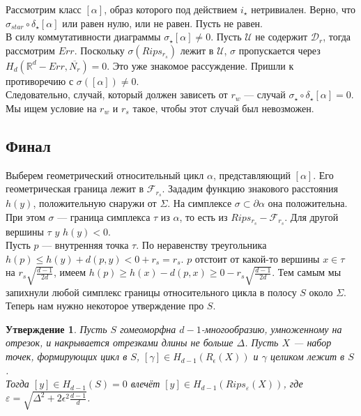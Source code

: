 \documentclass[english,12pt]{article}
\newcounter{stmcounter}[section]
\numberwithin{equation}{section}
\newtheorem{proposition}[stmcounter]{Утверждение}
\theoremstyle{definition}
\theoremstyle{remark}
\renewcommand{\leq}{\leqslant}
\renewcommand{\geq}{\geqslant}
\begin{document}
Рассмотрим класс $[\alpha]$, образ которого под действием $i_{\star}$ нетривиален. Верно, что $\sigma_{star} \circ \delta_{\star}[\alpha]$ или равен нулю, или не равен. Пусть не равен.\\

В силу коммутативности диаграммы $\sigma_{\star}[\alpha] \neq 0$. Пусть $\mathcal{U}$ не содержит $\mathcal{D}_r$, тогда рассмотрим $Err$. Поскольку $\sigma(Rips_{r_s})$ лежит в $\mathcal{U}$, $\sigma$ пропускается через $H_d(\mathbb{R}^d - Err, \overline{N_r}) = 0$. Это уже знакомое рассуждение. Пришли к противоречию с $\sigma([\alpha]) \neq 0$.\\

Следовательно, случай, который должен зависеть от $r_w$ --- случай $\sigma_{\star} \circ \delta_{\star}[\alpha] = 0$. Мы ищем условие на $r_w$ и $r_s$ такое, чтобы этот случай был невозможен.

\subsection{Финал}

Выберем геометрический относительный цикл $\alpha$, представляющий $[\alpha]$. Его геометрическая граница лежит в $\mathcal{F}_{r_s}$. Зададим функцию знакового расстояния $h(y)$, положительную снаружи от $\Sigma$. На симплексе $\sigma \subset \partial \alpha$ она положительна. При этом $\sigma$ --- граница симплекса $\tau$ из $\alpha$, то есть из $Rips_{r_s} - \mathcal{F}_{r_s}$. Для другой вершины $\tau$ $y$ $h(y) < 0$.\\

Пусть $p$ --- внутренняя точка $\tau$. По неравенству треугольника $h(p) \leq h(y) + d(p,y) < 0 + r_s = r_s$. $p$ отстоит от какой-то вершины $x \in \tau$ на $r_s\sqrt{\frac{d-1}{2d}}$, имеем $h(p) \geq h(x) - d(p,x) \geq 0 - r_s\sqrt{\frac{d-1}{2d}}$. Тем самым мы запихнули любой симплекс границы относительного цикла в полосу $S$ около $\Sigma$.\\

Теперь нам нужно некоторое утверждение про $S$.
\begin{proposition}
  Пусть $S$ гомеоморфна $d-1$-многообразию, умноженному на отрезок, и накрывается отрезками длины не больше $\Delta$. Пусть $X$ --- набор точек, формирующих цикл в $S$, $[\gamma] \in H_{d-1}(R_{\epsilon}(X))$ и $\gamma$ целиком лежит в $S$.\\

  Тогда $[y] \in H_{d-1}(S) = 0$ влечёт $[y] \in H_{d-1}(Rips_{\varepsilon}(X))$, где $\varepsilon = \sqrt{\Delta^2 + 2\epsilon^2\frac{d-1}{d}}$.
\end{proposition}
\end{document}
